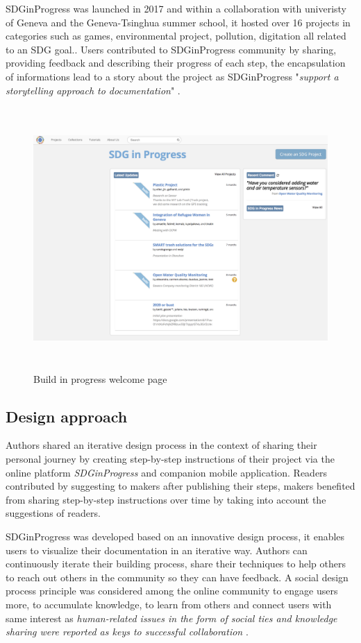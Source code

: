 SDGinProgress was launched in 2017 and within a collaboration with univeristy of Geneva and the Geneva-Tsinghua summer school, it hosted over 16 projects in categories such as games, environmental project, pollution, digitation all related to an SDG goal.. Users contributed to SDGinProgress community by sharing, providing feedback and describing their progress of each step, the encapsulation of informations lead to a story about the project as SDGinProgress "\textit{support a storytelling approach to documentation}" \cite{tseng2016making}.
\begin{figure}[ht!]
	\centering
	\includegraphics[width=15cm, height=10cm]{./images/img-sdginprogress.png}
	\caption{Build in progress welcome page}
	\label{img-sdginprogress}
\end{figure}

\subsection{Design approach}
Authors shared an iterative design process in the context of sharing their personal journey by creating step-by-step instructions of their project via the online platform \textit{SDGinProgress} and companion mobile application. Readers contributed by suggesting to makers after publishing their steps, makers benefited from sharing step-by-step instructions over time by taking into account the suggestions of readers.

SDGinProgress was developed based on an innovative design process, it enables users to visualize their documentation in an iterative way. Authors can continuously iterate their building process, share their techniques to help others to reach out others in the community so they can have feedback. A social design process principle was considered among the online community to engage users more, to accumulate knowledge, to learn from others and connect users with same interest as \textit{human-related issues in the form of social ties and knowledge sharing were reported as keys to successful collaboration} \cite{Kotlarsky2005}.

